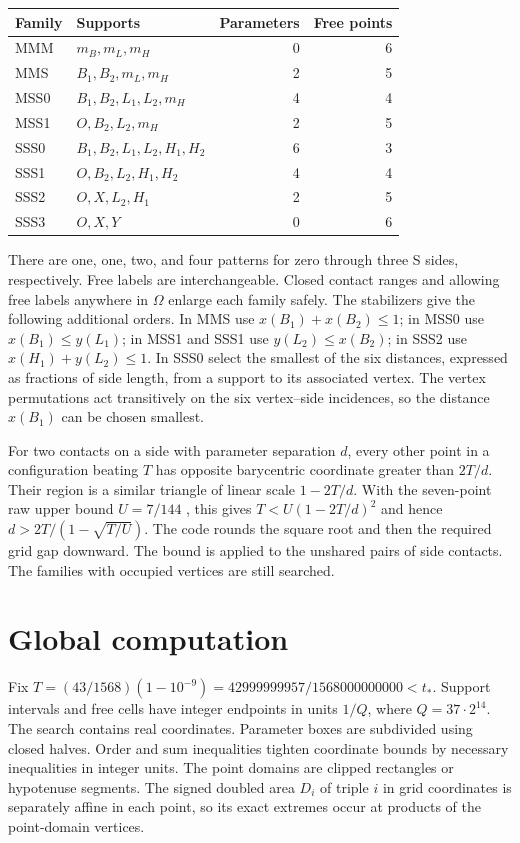 \documentclass[11pt]{amsart}
\newcommand{\Om}{\Omega}
\begin{document}
\begin{center}
\begin{tabular}{llrr}
\toprule
Family & Supports & Parameters & Free points\\
\midrule
MMM & \(m_B,m_L,m_H\) &0&6\\
MMS & \(B_1,B_2,m_L,m_H\) &2&5\\
MSS0 & \(B_1,B_2,L_1,L_2,m_H\) &4&4\\
MSS1 & \(O,B_2,L_2,m_H\) &2&5\\
SSS0 & \(B_1,B_2,L_1,L_2,H_1,H_2\) &6&3\\
SSS1 & \(O,B_2,L_2,H_1,H_2\) &4&4\\
SSS2 & \(O,X,L_2,H_1\) &2&5\\
SSS3 & \(O,X,Y\) &0&6\\
\bottomrule
\end{tabular}
\end{center}
There are one, one, two, and four patterns for zero through three S sides, respectively. Free labels are interchangeable. Closed contact ranges and allowing free labels anywhere in \(\Om\) enlarge each family safely. The stabilizers give the following additional orders. In MMS use \(x(B_1)+x(B_2)\le1\); in MSS0 use \(x(B_1)\le y(L_1)\); in MSS1 and SSS1 use \(y(L_2)\le x(B_2)\); in SSS2 use \(x(H_1)+y(L_2)\le1\). In SSS0 select the smallest of the six distances, expressed as fractions of side length, from a support to its associated vertex. The vertex permutations act transitively on the six vertex--side incidences, so the distance \(x(B_1)\) can be chosen smallest.

For two contacts on a side with parameter separation \(d\), every other point in a configuration beating \(T\) has opposite barycentric coordinate greater than \(2T/d\). Their region is a similar triangle of linear scale \(1-2T/d\). With the seven-point raw upper bound \(U=7/144\) \cite{ZC}, this gives \(T<U(1-2T/d)^2\) and hence \(d>2T/(1-\sqrt{T/U})\). The code rounds the square root and then the required grid gap downward. The bound is applied to the unshared pairs of side contacts. The families with occupied vertices are still searched.

\section{Global computation}
Fix \(T=(43/1568)(1-10^{-9})=42999999957/1568000000000<t_*\).
Support intervals and free cells have integer endpoints in units \(1/Q\), where \(Q=37\cdot2^{14}\). The search contains real coordinates. Parameter boxes are subdivided using closed halves. Order and sum inequalities tighten coordinate bounds by necessary inequalities in integer units. The point domains are clipped rectangles or hypotenuse segments. The signed doubled area \(D_i\) of triple \(i\) in grid coordinates is separately affine in each point, so its exact extremes occur at products of the point-domain vertices.
\end{document}
